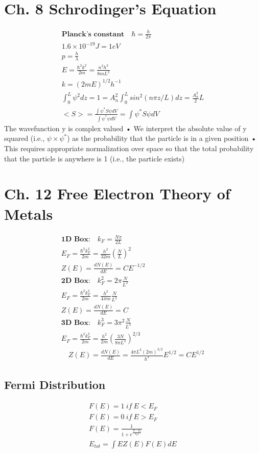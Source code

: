 \begin{multicols}{3}
\section{Ch. 8 Schrodinger's Equation}
\begin{align}
\textbf{Planck's constant} \quad \hbar = \frac{h}{2 \pi} \\
1.6 \times 10^{-19}J= 1 eV	\\
p = \frac{h}{\lambda} \\
E = \frac{\hbar^2 k^2}{2m}= \frac{n^2h^2}{8mL^2} \\
k=(2mE)^{1/2}h^{-1}	\\
\int_{0}^{L} \psi^2 dz = 1 = A_n^2 \int_{0}^{L} sin^2(n \pi z /L) dz = \frac{A_n^2}{2}L \\
<S> = \frac{\int \psi^*S\psi dV}{\int \psi^*\psi dV}=\int \psi^*S\psi dV
\end{align}
The wavefunction y is complex valued
• We interpret the absolute value of y squared
(i.e., $\psi \times \psi^*$) as the probability that the
particle is in a given position
• This requires appropriate normalization over
space so that the total probability that the
particle is anywhere is 1 (i.e., the particle
exists)
\section{Ch. 12 Free Electron Theory of Metals}
\begin{align}
\textbf{1D Box:} \quad k_F = \frac{N \pi}{2 L} \\
E_F=\frac{\hbar^2k_F^2}{2m}=
\frac{h^2}{32m}\left(\frac
{N}{L}\right)^2 \\
Z(E)=\frac{dN(E)}{dE}= CE^{-1/2} \\
\textbf{2D Box:} \quad k_F^2 = 2 \pi \frac{N}{L^2} \\
E_F=\frac{\hbar^2k_F^2}{2m}=
\frac{h^2}{4 \pi m}\frac
{N}{L^2}	\\
Z(E)=\frac{dN(E)}{dE}= C \\
\textbf{3D Box:} \quad k_F^3 = 3 \pi^2 \frac{N}{L^3} \\
E_F=\frac{\hbar^2k_F^2}{2m}=
\frac{h^2}{2m}\left(\frac
{3N}{8 \pi L^3}\right)^{2/3} \\
\quad Z(E)=\frac{dN(E)}{dE}= \frac{4\pi L^3 (2m)^{3/2}}{h^3}
E^{1/2}=CE^{1/2}
\end{align}
\subsection{Fermi Distribution}
\begin{align}
F(E)= 1 \ if \ E < E_F \\
F(E)= 0 \ if \ E > E_F \\
F(E)= \frac{1}{1+e^{\frac{E-E_F}{k_BT}}} \\
E_{tot}= \int EZ(E)F(E)dE
\end{align}

\end{multicols}
